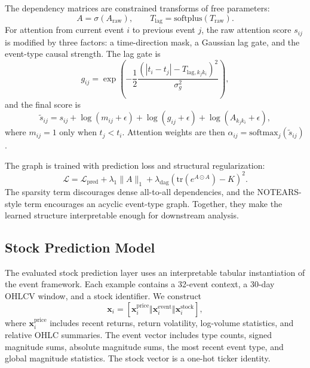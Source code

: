 \documentclass[sigconf,review]{acmart}
\begin{document}
The dependency matrices are constrained transforms of free parameters:
\begin{equation}
A=\sigma(A_{\mathrm{raw}}), \qquad T_{\mathrm{lag}}=\mathrm{softplus}(T_{\mathrm{raw}}).
\end{equation}
For attention from current event $i$ to previous event $j$, the raw attention score $s_{ij}$ is modified by three factors: a time-direction mask, a Gaussian lag gate, and the event-type causal strength. The lag gate is
\begin{equation}
g_{ij}=\exp\left(-\frac{1}{2}\frac{(|t_i-t_j|-T_{\mathrm{lag},k_jk_i})^2}{\sigma_g^2}\right),
\end{equation}
and the final score is
\begin{equation}
\tilde{s}_{ij}=s_{ij}+\log(m_{ij}+\epsilon)+\log(g_{ij}+\epsilon)+\log(A_{k_jk_i}+\epsilon),
\end{equation}
where $m_{ij}=1$ only when $t_j<t_i$. Attention weights are then $\alpha_{ij}=\mathrm{softmax}_j(\tilde{s}_{ij})$.

The graph is trained with prediction loss and structural regularization:
\begin{equation}
\mathcal{L}=\mathcal{L}_{\mathrm{pred}}+\lambda_1\|A\|_1+\lambda_{\mathrm{dag}}\left(\mathrm{tr}\left(e^{A\odot A}\right)-K\right)^2.
\end{equation}
The sparsity term discourages dense all-to-all dependencies, and the NOTEARS-style term encourages an acyclic event-type graph. Together, they make the learned structure interpretable enough for downstream analysis.

\subsection{Stock Prediction Model}

The evaluated stock prediction layer uses an interpretable tabular instantiation of the event framework. Each example contains a 32-event context, a 30-day OHLCV window, and a stock identifier. We construct
\begin{equation}
\mathbf{x}_i=[\mathbf{x}^{\mathrm{price}}_i\Vert \mathbf{x}^{\mathrm{event}}_i\Vert \mathbf{x}^{\mathrm{stock}}_i],
\end{equation}
where $\mathbf{x}^{\mathrm{price}}_i$ includes recent returns, return volatility, log-volume statistics, and relative OHLC summaries. The event vector includes type counts, signed magnitude sums, absolute magnitude sums, the most recent event type, and global magnitude statistics. The stock vector is a one-hot ticker identity.
\end{document}
